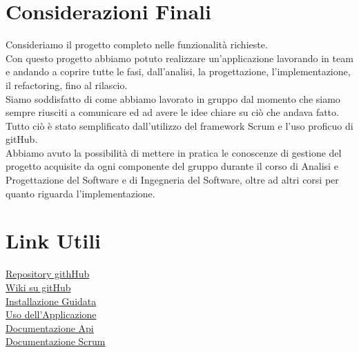\documentclass[a4paper,12pt]{report}
\begin{document}
	\section{Considerazioni Finali}
Consideriamo il progetto completo nelle funzionalità richieste.\\
Con questo progetto abbiamo potuto realizzare un'applicazione lavorando in team e andando a coprire tutte le fasi, dall'analisi, la progettazione, l'implementazione, il refactoring, fino al rilascio.\\
Siamo soddisfatto di come abbiamo lavorato in gruppo dal momento che siamo sempre riusciti a comunicare ed ad avere le idee chiare su ciò che andava fatto. Tutto ciò è stato semplificato dall'utilizzo del framework Scrum e l'uso proficuo di gitHub.\\
Abbiamo avuto la possibilità di mettere in pratica le conoscenze di gestione del progetto acquisite da ogni componente del gruppo durante il corso di Analisi e Progettazione del Software e di Ingegneria del Software, oltre ad altri corsi per quanto riguarda l'implementazione.\\
 
	
	
 	\section{Link Utili}  
	\href{https://github.com/lta-unimib/progetto-brew-day-1-brew-day-birra}{Repository githHub}\\
	\href{https://github.com/lta-unimib/progetto-brew-day-1-brew-day-birra/wiki}{Wiki su gitHub}\\
	\href{https://github.com/lta-unimib/progetto-brew-day-1-brew-day-birra/wiki/Installazione-Guidata}{Installazione Guidata}\\
	\href{https://github.com/lta-unimib/progetto-brew-day-1-brew-day-birra/wiki/Uso-dell'Applicazione}{Uso dell'Applicazione}\\
	\href{https://github.com/lta-unimib/progetto-brew-day-1-brew-day-birra/tree/master/backend#readme}{Documentazione Api}\\
	\href{https://github.com/lta-unimib/progetto-brew-day-1-brew-day-birra/tree/master/scrum}{Documentazione Scrum}\\
\end{document}
